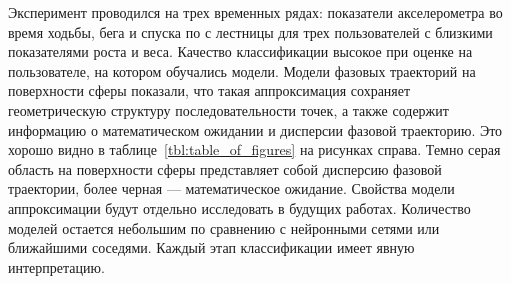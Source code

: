 \documentclass[12pt,twoside]{article}
\begin{document}
Эксперимент проводился на трех временных рядах: показатели акселерометра во время ходьбы, бега и спуска по с лестницы для трех пользователей с близкими показателями роста и веса.
Качество классификации высокое при оценке на пользователе, на котором обучались модели.
Модели фазовых траекторий на поверхности сферы показали, что такая аппроксимация сохраняет геометрическую структуру последовательности точек, а также содержит информацию о математическом ожидании и дисперсии фазовой траекторию.
Это хорошо видно в таблице~\ref{tbl:table_of_figures} на рисунках справа.
Темно серая область на поверхности сферы представляет собой дисперсию фазовой траектории, более черная --- математическое ожидание.
Свойства модели аппроксимации будут отдельно исследовать в будущих работах.
Количество моделей остается небольшим по сравнению с нейронными сетями или ближайшими соседями.
Каждый этап классификации имеет явную интерпретацию.
\newpage

\end{document}
